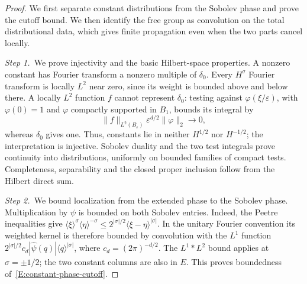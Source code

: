 \begin{proof}
  We first separate constant distributions from the Sobolev phase and prove
  the cutoff bound. We then identify the free group as convolution on the
  total distributional data, which gives finite propagation even when the two
  parts cancel locally.

  \medskip
  \noindent\textit{Step 1.~}We prove injectivity and the basic Hilbert-space
  properties.
  A nonzero constant has Fourier transform a nonzero multiple of $\delta_0$.
  Every $H^\sigma$ Fourier transform is locally $L^2$ near zero, since its
  weight is bounded above and below there. A locally $L^2$ function $f$ cannot
  represent $\delta_0$: testing against $\varphi(\xi/\varepsilon)$, with
  $\varphi(0) = 1$ and $\varphi$ compactly supported in $B_1$, bounds its
  integral by
  \[
    \|f\|_{L^2(B_\varepsilon)}
    \varepsilon^{d/2}\|\varphi\|_2\longrightarrow0,
  \]
  whereas $\delta_0$ gives one. Thus, constants lie in neither $H^{1/2}$ nor
  $H^{-1/2}$; the interpretation is injective. Sobolev duality and the two test
  integrals prove continuity into distributions, uniformly on bounded families
  of compact tests. Completeness, separability and the closed proper inclusion
  follow from the Hilbert direct sum.


  \medskip
  \noindent\textit{Step 2.~}We bound localization from the extended phase to
  the Sobolev phase.
  Multiplication by $\psi$ is bounded on both Sobolev entries. Indeed, the
  Peetre inequalities give $\langle\xi\rangle^\sigma\langle\eta\rangle^{-\sigma}
  \le 2^{|\sigma|/2}\langle\xi-\eta\rangle^{|\sigma|}$. In the unitary Fourier
  convention its weighted kernel is therefore bounded by convolution with the
  $L^1$ function $2^{|\sigma|/2}c_d|\widehat{\psi}(q)|\langle
  q\rangle^{|\sigma|}$, where $c_d = (2\pi)^{-d/2}$. The $L^1*L^2$ bound applies
  at $\sigma = \pm1/2$; the two constant columns are also in $E$. This proves
  boundedness of~\eqref{E:constant-phase-cutoff}.


\end{proof}
